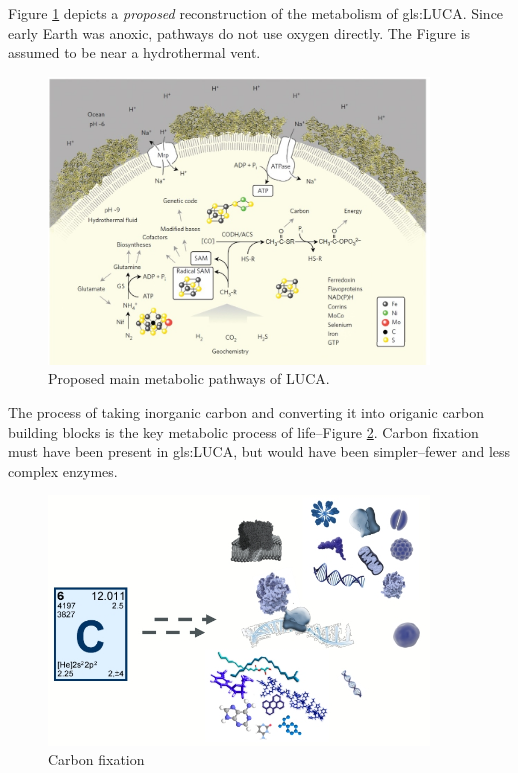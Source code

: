 \documentclass[]{article}
\begin{document}
Figure \ref{fig:LUCA_Environment} depicts a \textit{proposed} reconstruction of the metabolism of \gls{gls:LUCA}\cite{weiss2016physiology}. Since early Earth was anoxic, pathways do not use oxygen directly. The Figure is assumed to be near a hydrothermal vent.
\begin{figure}[H]
	\caption{Proposed main metabolic pathways of LUCA. } \label{fig:LUCA_Environment} 
	\includegraphics[width=0.9\textwidth]{LUCA_Environment}
\end{figure}

The process of taking inorganic carbon and converting it into origanic carbon building blocks is the key metabolic process of life--Figure \ref{fig:CarbonRules}. Carbon fixation must have been present in \gls{gls:LUCA}, but would have been simpler--fewer and less complex enzymes.
\begin{figure}[H]
	\caption{Carbon fixation} \label{fig:CarbonRules} 
	\includegraphics[width=0.9\textwidth]{CarbonRules}
\end{figure}
\end{document}
